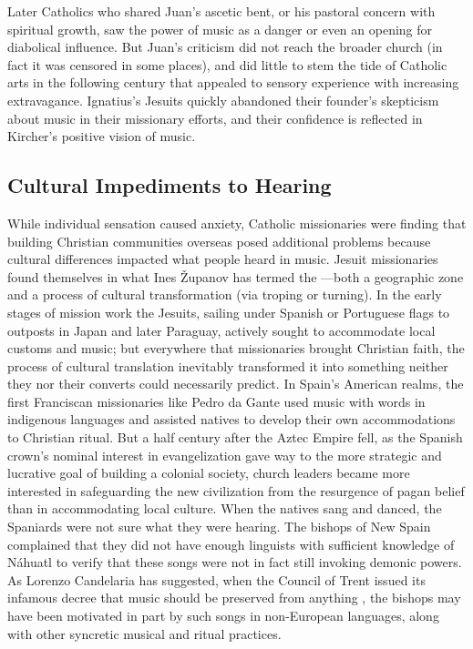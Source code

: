 
Later Catholics who shared Juan's ascetic bent, or his pastoral concern with
spiritual growth, saw the power of music as a danger or even an opening for
diabolical influence.
But Juan's criticism did not reach the broader church (in fact it was censored
in some places), and did little to stem the tide of Catholic arts in the
following century that appealed to sensory experience with increasing
extravagance. 
Ignatius's Jesuits quickly abandoned their founder's skepticism about music in
their missionary efforts, and their confidence is reflected in Kircher's
positive vision of music.

\subsection{Cultural Impediments to Hearing}

While individual sensation caused anxiety, Catholic missionaries were finding
that building Christian communities overseas posed additional problems because
cultural differences impacted what people heard in music.
Jesuit missionaries found themselves in what Ines Županov has termed the
---both a geographic zone and a process of  
cultural transformation (via troping or turning).%
    \Autocite{Zupanov:MissionaryTropics}
In the early stages of mission work the Jesuits, sailing under Spanish or
Portuguese flags to outposts in Japan and later Paraguay, actively sought to
accommodate local customs and music; but everywhere that missionaries brought
Christian faith, the process of cultural translation inevitably transformed it
into something neither they nor their converts could necessarily predict.%
    \Autocites
    {Coelho:NewWorlds}
    {Waterhouse:EarliestJapaneseContacts}
    {Brito:SoundsDiscoveries}
    {Waisman:JesuitReducciones}
    {Bailey:Art}
    {Fromont:DancingKingCongo}
In Spain's American realms, the first Franciscan missionaries like Pedro da
Gante used music with words in indigenous languages and assisted natives to
develop their own accommodations to Christian ritual.%
    \Autocites
    [637]{Candelaria:Psalmodia}
    {Scolieri:DancingNewWorld}
But a half century after the Aztec Empire fell, as the Spanish crown's
nominal interest in evangelization gave way to the more strategic and lucrative
goal of building a colonial society, church leaders became more interested in
safeguarding the new civilization from the resurgence of pagan belief than in
accommodating local culture. 
When the natives sang and danced, the Spaniards were not sure what they were
hearing. 
The bishops of New Spain complained that they did not have enough linguists
with sufficient knowledge of Náhuatl to verify that these songs were not in
fact still invoking demonic powers.
As Lorenzo Candelaria has suggested, when the Council of Trent issued its
infamous decree that music should be preserved from anything , the bishops may have been motivated in part by such songs
in non-European languages, along with other syncretic musical and ritual
practices.%
    \Autocite[637--638]{Candelaria:Psalmodia}


